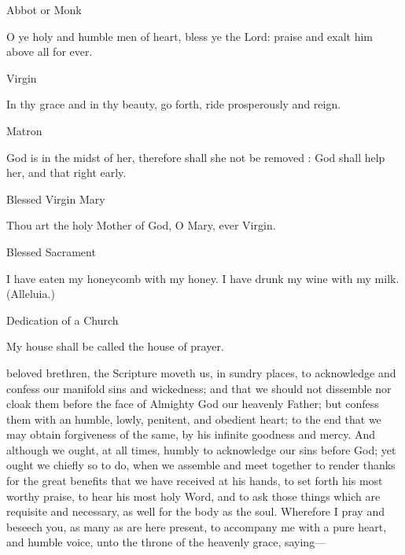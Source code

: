 \begin{multicols}{2}
\begin{inhead}
Abbot or Monk
\end{inhead}\noindent
O ye holy and humble men of heart, bless ye the Lord: praise and exalt him above all for ever.

\begin{inhead}
Virgin
\end{inhead}\noindent
In thy grace and in thy beauty, go forth, ride prosperously and reign.

\begin{inhead}
Matron
\end{inhead}\noindent
God is in the midst of her, therefore shall she not be removed : God shall help her, and that right early.

\begin{inhead}
Blessed Virgin Mary
\end{inhead}\noindent
Thou art the holy Mother of God, O Mary, ever Virgin.

\begin{inhead}
Blessed Sacrament
\end{inhead}\noindent
I have eaten my honeycomb with my honey. I have drunk my wine with my milk. (Alleluia.)

\begin{inhead}
Dedication of a Church
\end{inhead}\noindent
	My house shall be called the house of prayer.
\end{multicols}
 beloved brethren, the Scripture moveth us, in sundry places, to acknowledge and confess our manifold sins and wickedness; and that we should not dissemble nor cloak them before the face of Almighty God our heavenly Father; but confess them with an humble, lowly, penitent, and obedient heart; to the end that we may obtain forgiveness of the same, by his infinite goodness and mercy. And although we ought, at all times, humbly to acknowledge our sins before God; yet ought we chiefly so to do, when we assemble and meet together to render thanks for the great benefits that we have received at his hands, to set forth his most worthy praise, to hear his most holy Word, and to ask those things which are requisite and necessary, as well for the body as the soul. Wherefore I pray and beseech you, as many as are here present, to accompany me with a pure heart, and humble voice, unto the throne of the heavenly grace, saying---
